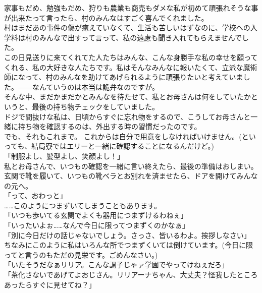 \documentclass[oneside, a4paper]{jsbook}
\begin{document}
家事もだめ、勉強もだめ、狩りも農業も商売もダメな私が初めて頑張れそうな事が出来たって言ったら、村のみんなはすごく喜んでくれました。\\
村はまだあの事件の傷が癒えていなくて、生活も苦しいはずなのに、学校への入学料は村のみんなで出すって言って、私の遠慮も聞き入れてもらえませんでした。\\
この日見送りに来てくれてた人たちはみんな、こんな身勝手な私の幸せを願ってくれる、私の大好きな人たちです。私はそんなみんなに報いたくて、立派な魔術師になって、村のみんなを助けてあげられるように頑張りたいと考えていました。――なんていうのは本当は詭弁なのですが。\\

そんな中、まだかまだかとみんなを待たせて、私とお母さんは何をしていたかというと、最後の持ち物チェックをしていました。\\
ドジで間抜けな私は、日頃からすぐに忘れ物をするので、こうしてお母さんと一緒に持ち物を確認するのは、外出する時の習慣だったのです。\\
でも、それもこれまで。
これからは自分で用意をしなければいけません。(といっても、結局寮ではエリーと一緒に確認することになるんだけど。)\\

「制服よし、髪型よし、笑顔よし！」\\
私とお母さんで、いつもの確認を一緒に言い終えたら、最後の準備はおしまい。\\
玄関で靴を履いて、いつもの靴ベラとお別れを済ませたら、ドアを開けてみんなの元へ。\\

\noindent
「って、おわっと」\\

……このようにつまずいてしまうこともあります。\\

\noindent
「いつも歩いてる玄関でよくも器用につまずけるわねぇ」\\
「いったいよぉ……なんで今日に限ってつまずくのかなぁ」\\
「別に今日だけの話じゃないでしょう。さっさ、皆いるわよ。挨拶しなさい」\\

ちなみにこのように私はいろんな所でつまずくいては倒けています。(今日に限ってと言うのもただの見栄です。ごめんなさい。)\\

\noindent
「いたそうだなぁリリア。こんな調子じゃァ学園でやってけねぇだろ」\\
「茶化さないであげてよおじさん。リリアーナちゃん、大丈夫？怪我したところあったらすぐに見せてね？」\\
\end{document}
